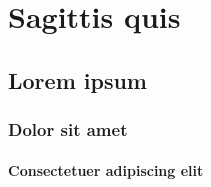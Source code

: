\documentclass[a4paper,12pt]{book}
\begin{document}
 \chapter{Sagittis quis} %
\lipsum[1]

\section{Lorem ipsum}
\lipsum[1]

\subsection{Dolor sit amet}
\lipsum[1]

\subsubsection{Consectetuer adipiscing elit}
\lipsum[1]
\end{document}
